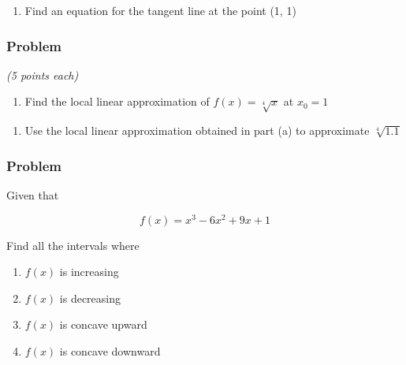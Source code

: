 \documentclass[
  letterpaper,
  DIV=11,
  numbers=noendperiod]{scrartcl}
\providecommand{\tightlist}{%
  \setlength{\itemsep}{0pt}\setlength{\parskip}{0pt}}\usepackage{longtable,booktabs,array}
\begin{document}
\begin{enumerate}
\def\labelenumi{(\alph{enumi})}
\setcounter{enumi}{2}
\tightlist
\item
  Find an equation for the tangent line at the point (1, 1)
\end{enumerate}

\hfill\break

\thispagestyle{empty}

\hfill\break
\hfill\break
\hfill\break
\hfill\break
\hfill\break
\hfill\break
\hfill\break
\hfill\break
\hfill\break
\hfill\break
\hfill\break
\hfill\break
\hfill\break

\subsubsection{Problem}\label{problem-6}

\emph{(5 points each)}

\begin{enumerate}
\def\labelenumi{(\alph{enumi})}
\tightlist
\item
  Find the local linear approximation of \(f(x) = \sqrt[4]{x}\) at
  \(x_0 = 1\)\\
\end{enumerate}

\thispagestyle{empty}

\hfill\break
\hfill\break
\hfill\break
\hfill\break
\hfill\break
\hfill\break
\hfill\break
\hfill\break
\hfill\break
\hfill\break
\hfill\break
\hfill\break
\hfill\break

\begin{enumerate}
\def\labelenumi{(\alph{enumi})}
\setcounter{enumi}{1}
\tightlist
\item
  Use the local linear approximation obtained in part (a) to approximate
  \(\sqrt[4]{1.1}\)
\end{enumerate}

\thispagestyle{empty}

\subsubsection{Problem}\label{problem-7}

Given that

\[f(x) =  x^3 - 6x^2 + 9x + 1\]

Find all the intervals where

\begin{enumerate}
\def\labelenumi{\alph{enumi}.}
\tightlist
\item
  \(f(x)\) is increasing
\item
  \(f(x)\) is decreasing
\item
  \(f(x)\) is concave upward
\item
  \(f(x)\) is concave downward
\end{enumerate}
\end{document}
